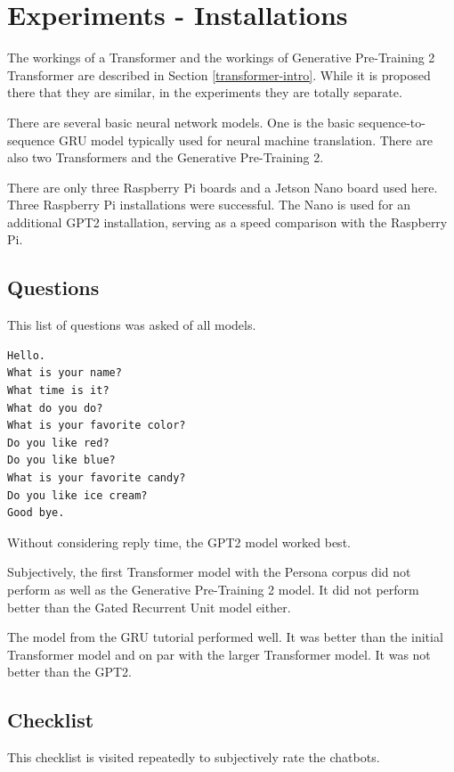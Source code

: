 

\section{Experiments - Installations}
The workings of a Transformer and the workings of Generative Pre-Training 2 Transformer are described in Section \ref{transformer-intro}. While it is proposed there that they are similar, in the experiments they are totally separate.

There are several basic neural network models. One is the basic sequence-to-sequence GRU model typically used for neural machine translation. There are also two Transformers and the Generative Pre-Training 2.  

There are only three Raspberry Pi boards and a Jetson Nano board used here. Three Raspberry Pi installations were successful. The Nano is used for an additional GPT2 installation, serving as a speed comparison with the Raspberry Pi. 


\subsection{Questions}
This list of questions was asked of all models. 

\begin{verbatim}
Hello.
What is your name? 
What time is it?
What do you do?
What is your favorite color?
Do you like red?
Do you like blue?
What is your favorite candy?
Do you like ice cream?
Good bye.
\end{verbatim}

Without considering reply time, the GPT2 model worked best. 

Subjectively, the first Transformer model with the Persona corpus did not perform as well as the Generative Pre-Training 2 model. It did not perform better than the Gated Recurrent Unit model either. 

The model from the GRU tutorial performed well. It was better than the initial Transformer model and on par with the larger Transformer model. It was not better than the GPT2.

\subsection{Checklist} 

This checklist is visited repeatedly to subjectively rate the chatbots.


